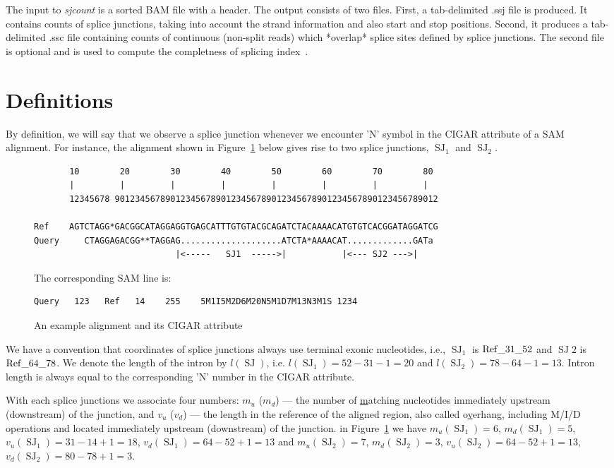 \documentclass{article}
\DeclareMathOperator{\SJ}{SJ}
\begin{document}
The input to {\em sjcount} is a sorted BAM file with a header. The output consists of two files.
First, a tab-delimited .ssj file is produced. It contains counts of splice junctions, taking into 
account the strand information and also start and stop positions. Second, it produces a tab-delimited
.ssc file containing counts of continuous (non-split reads) which *overlap* splice sites defined by 
splice junctions. The second file is optional and is used to compute the completness of splicing 
index~\cite{}.

\section{Definitions}

By definition, we will say that we observe a splice junction whenever we encounter 'N' symbol in the CIGAR 
attribute of a SAM alignment. For instance, the alignment shown in Figure~\ref{fig::01} below gives rise to 
two splice junctions, $\SJ_1$ and $\SJ_2$.
%
\begin{figure}[h]
\footnotesize
\begin{verbatim}
       10        20        30        40        50        60        70        80
       |         |         |         |         |         |         |         |
       12345678 9012345678901234567890123456789012345678901234567890123456789012

Ref    AGTCTAGG*GACGGCATAGGAGGTGAGCATTTGTGTACGCAGATCTACAAAACATGTGTCACGGATAGGATCG
Query     CTAGGAGACGG**TAGGAG....................ATCTA*AAAACAT.............GATa
                            |<-----   SJ1  ----->|           |<--- SJ2 --->|
\end{verbatim}

The corresponding SAM line is:
\begin{verbatim}
Query   123   Ref   14    255    5M1I5M2D6M20N5M1D7M13N3M1S 1234 
\end{verbatim}
\caption{An example alignment and its CIGAR attribute\label{fig::01}}
\end{figure}
%
We have a convention that coordinates of splice junctions always use terminal exonic nucleotides, i.e., $\SJ_1$ is 
$\rm Ref\_31\_52$ and $\SJ2$ is $\rm Ref\_64\_78$. We denote the length of the intron by $l(\SJ)$, i.e. $l(\SJ_1)=52-31-1=20$ 
and $l(\SJ_2)=78-64-1=13$. Intron length is always equal to the corresponding 'N' number in the CIGAR attribute.

With each splice junctions we associate four numbers: $m_u$ ($m_d$) --- the number of \underline{m}atching nucleotides 
immediately upstream (downstream) of the junction, and $v_u$ ($v_d$) --- the length in the reference of the aligned region,
also called o\underline{v}erhang, including M/I/D operations and located immediately upstream (downstream) of the junction.
in Figure~\ref{fig::01} we have $m_u(\SJ_1)=6$, $m_d(\SJ_1)=5$, $v_u(\SJ_1)=31-14+1=18$, $v_d(\SJ_1)=64-52+1=13$ and
$m_u(\SJ_2)=7$, $m_d(\SJ_2)=3$, $v_u(\SJ_2)=64-52+1=13$, $v_d(\SJ_2)=80-78+1=3$.
\end{document}
